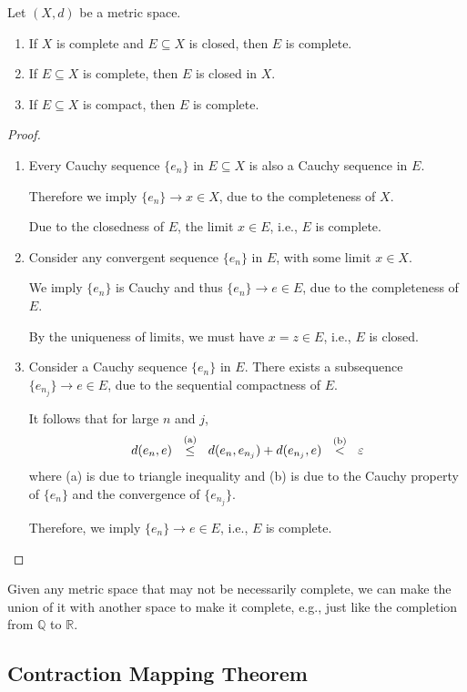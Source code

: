 \begin{proposition}
Let $(X,d)$ be a metric space.
\begin{enumerate}
\item
If $X$ is complete and $E\subseteq X$ is closed, then $E$ is complete.
\item
If $E\subseteq X$ is complete, then $E$ is closed in $X$.
\item
If $E\subseteq X$ is compact, then $E$ is complete.
\end{enumerate}
\end{proposition}
\begin{proof}
\begin{enumerate}
\item
Every Cauchy sequence $\{e_n\}$ in $E\subseteq X$ is also a Cauchy sequence in $E$.

Therefore we imply $\{e_n\}\to x\in X$, due to the completeness of $X$.

Due to the closedness of $E$, the limit $x\in E$, i.e., $E$ is complete.
\item
Consider any convergent sequence $\{e_n\}$ in $E$, with some limit $x\in X$.

We imply $\{e_n\}$ is Cauchy and thus $\{e_n\}\to e\in E$, due to the completeness of $E$.

By the uniqueness of limits, we must have $x=z\in E$, i.e., $E$ is closed.
\item
Consider a Cauchy sequence $\{e_n\}$ in $E$.
There exists a subsequence $\{e_{n_j}\}\to e\in E$, 
due to the sequential compactness of $E$.

It follows that for large $n$ and $j$,
\[
d(e_n,e)
\makebox[1cm][c]{$\overset{\text{(a)}} \leq$}
 d(e_n,e_{n_j})+d(e_{n_j},e)
 \makebox[1cm][c]{$\overset{\text{(b)}} <$}
 \varepsilon
\]
where (a) is due to triangle inequality
and (b) is due to the Cauchy property of $\{e_n\}$ and the convergence of $\{e_{n_j}\}$. 

Therefore, we imply $\{e_n\}\to e\in E$, i.e., $E$ is complete.
\end{enumerate}
\end{proof}

\begin{remark}
Given any metric space that may not be necessarily complete, we can make the union of it with another space to make it complete, e.g., just like the completion from $\mathbb{Q}$ to $\mathbb{R}$.
\end{remark}


\subsection{Contraction Mapping Theorem}

